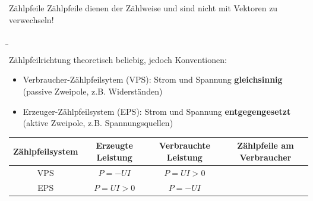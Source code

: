 \begin{frame}
{		
		\begin{Merksatz}{Zählpfeile}
			Zählpfeile dienen der Zählweise und sind nicht mit Vektoren zu verwechseln!
		\end{Merksatz}
		
	}
	
	
	
	\b{
		Zählpfeilrichtung theoretisch beliebig, jedoch Konventionen: 
		\begin{itemize}
			\item Verbraucher-Zählpfeilsytem (VPS): Strom und Spannung \textbf{gleichsinnig}\\
			      (passive Zweipole, z.B. Widerständen)
			\item Erzeuger-Zählpfeilsystem (EPS): Strom und Spannung \textbf{entgegengesetzt}\\
			      (aktive Zweipole, z.B. Spannungsquellen)
		\end{itemize}
		
		
		
		\begin{table}[ht]
			\centering
			\begin{tabular}{|c|c|c|c|}
				\hline
				Zählpfeilsystem & Erzeugte Leistung & Verbrauchte Leistung & Zählpfeile am Verbraucher                                                      \\ \hline
				VPS             & $P = -UI$           & $P = UI > 0$           &  \\ \hline
				EPS             & $P = UI > 0$        & $P = -UI$              &  \\ \hline
			\end{tabular}
			
		\end{table}
		
}
\end{frame}
